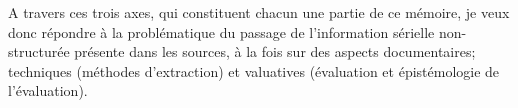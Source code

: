 A travers ces trois axes, qui constituent chacun une partie de ce mémoire, je veux donc répondre à la problématique du passage de l'information sérielle non-structurée présente dans les sources, à la fois sur des aspects documentaires; techniques (méthodes d'extraction) et valuatives (évaluation et épistémologie de l'évaluation).

